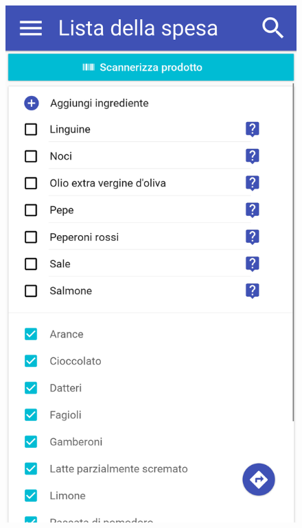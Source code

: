\begin{figure}[H]
\begin{minipage}{.49\textwidth}
		\includegraphics[width=\textwidth]{img/wireframe/lista_della_spesa_arance_checked.png}
	\end{minipage}
\end{figure}
